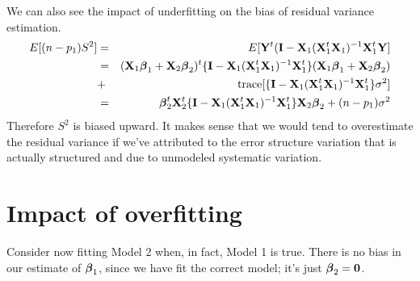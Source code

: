 We can also see the  impact of underfitting on the bias of residual variance estimation.
\begin{eqnarray*}
E[(n- p_1) S^2] & = & E[\mathbf{Y}^t (\mathbf{I} -  \mathbf{X}_1 (\mathbf{X}_1^t \mathbf{X}_1)^{-1} \mathbf{X}_1^t \mathbf{Y}] \\
& = &(\mathbf{X}_1\boldsymbol{\beta}_1 + \mathbf{X}_2 \boldsymbol{\beta}_2)^t\{\mathbf{I} -  \mathbf{X}_1 (\mathbf{X}_1^t \mathbf{X}_1)^{-1} \mathbf{X}_1^t\} (\mathbf{X}_1\boldsymbol{\beta}_1 + \mathbf{X}_2 \boldsymbol{\beta}_2) \\
& + & \mathrm{trace}[\{\mathbf{I} -  \mathbf{X}_1 (\mathbf{X}_1^t \mathbf{X}_1)^{-1} \mathbf{X}_1^t \} \sigma^2] \\
& = & \boldsymbol{\beta}_2^t \mathbf{X}_2^t \{\mathbf{I} -  \mathbf{X}_1 (\mathbf{X}_1^t \mathbf{X}_1)^{-1} \mathbf{X}_1^t\} \mathbf{X}_2 \boldsymbol{\beta}_2 + (n - p_1) \sigma^2
\end{eqnarray*}
Therefore $S^2$ is biased upward. It makes sense that we would tend to overestimate the residual
variance if we've attributed to the error structure variation that is actually structured and
due to unmodeled systematic variation.

\section{Impact of overfitting}
Consider now fitting Model 2 when, in fact, Model 1 is true. There
is no bias in our estimate of $\boldsymbol{\beta}_1$, since we have fit the correct model;
it's just $\boldsymbol{\beta}_2 = \mathbf{0}$.  

